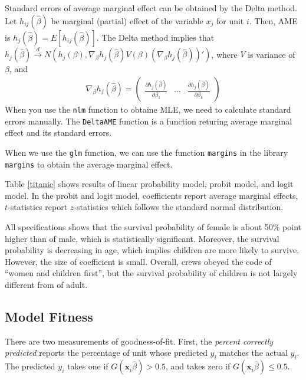 \documentclass[
  12pt,
]{article}
\begin{document}
Standard errors of average marginal effect can be obtained by the Delta
method. Let \(h_{ij}(\hat{\beta})\) be marginal (partial) effect of the
variable \(x_j\) for unit \(i\). Then, AME is
\(h_j(\hat{\beta}) = E[h_{ij}(\hat{\beta})]\). The Delta method implies
that
\(h_j(\hat{\beta}) \overset{d}{\to} N(h_j(\beta), \nabla_{\beta} h_j(\hat{\beta}) V(\beta) (\nabla_{\beta} h_j(\hat{\beta}))')\),
where \(V\) is variance of \(\beta\), and \begin{align*}
  \nabla_{\beta} h_j(\hat{\beta}) =
  \begin{pmatrix}
    \frac{\partial h_j(\hat{\beta})}{\partial \beta_1} & \cdots & \frac{\partial h_j(\hat{\beta})}{\partial \beta_k}
  \end{pmatrix}
\end{align*} When you use the \texttt{nlm} function to obtaine MLE, we
need to calculate standard errors manually. The \texttt{DeltaAME}
function is a function returing average marginal effect and its standard
errors.

When we use the \texttt{glm} function, we can use the function
\texttt{margins} in the library \texttt{margins} to obtain the average
marginal effect.

Table \ref{titanic} shows results of linear probability model, probit
model, and logit model. In the probit and logit model, coefficients
report average marginal effects, \(t\)-statistics report
\(z\)-statistics which follows the standard normal distribution.

All specifications shows that the survival probability of female is
about 50\% point higher than of male, which is statistically
significant. Moreover, the survival probability is decreasing in age,
which implies children are more likely to survive. However, the size of
coefficient is small. Overall, crews obeyed the code of ``women and
children first'', but the survival probability of children is not
largely different from of adult.

\hypertarget{model-fitness}{%
\subsection{Model Fitness}\label{model-fitness}}

There are two measurements of goodness-of-fit. First, the \emph{percent
correctly predicted} reports the percentage of unit whose predicted
\(y_i\) matches the actual \(y_i\). The predicted \(y_i\) takes one if
\(G(\mathbf{x}_i \hat{\beta}) > 0.5\), and takes zero if
\(G(\mathbf{x}_i \hat{\beta}) \le 0.5\).
\end{document}
